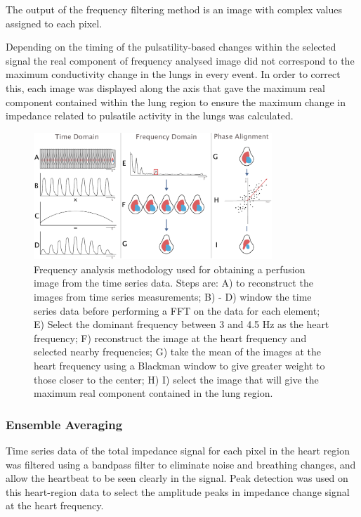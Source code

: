 The output of the frequency filtering method is an 
image with complex values assigned to each pixel.  

Depending on the timing of the pulsatility-based changes within the selected signal
the real component of frequency analysed image 
did not correspond to the maximum conductivity 
change in the lungs in every event.
In order to correct this, each image was displayed along the axis that gave the maximum real component contained
within the lung region to ensure
the maximum change in impedance related to pulsatile activity in the lungs was calculated.

\begin{figure}
\begin{flushright}
\includegraphics[width=0.8\textwidth]{chapter_2/imgs/fig-methodsFrequency.pdf}
\end{flushright}
\caption[Frequency analysis methods]{\label{fig:freqAnalysis}
Frequency analysis methodology used for obtaining a perfusion image 
from the time series data. Steps are: 
A) to reconstruct the images from time series measurements; 
B) - D) window the time series data before performing a 
FFT on the data for each element; 
E) Select the dominant frequency between 3 and 4.5 Hz as the heart frequency;
F) reconstruct the image at the heart frequency and selected nearby frequencies; 
G) take the mean of the images at the heart frequency using a Blackman window 
to give greater weight to those closer to the center; 
H) I) select the image that will give the maximum real component contained
in the lung region.
}
\end{figure}

\subsubsection{Ensemble Averaging}

Time series data of the total impedance signal for each pixel in the heart region was filtered 
using a bandpass filter to eliminate noise and breathing changes, 
and allow the heartbeat to be seen clearly in the signal.
Peak detection was used on this heart-region data
to select the amplitude peaks in impedance change
signal at the heart frequency.

